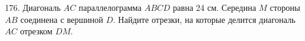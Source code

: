 176. Диагональ $AC$ параллелограмма $ABCD$ равна 24 см. Середина $M$ стороны $AB$ соединена с вершиной $D.$ Найдите отрезки, на которые делится диагональ $AC$ отрезком $DM.$\\
